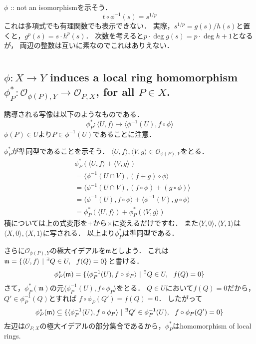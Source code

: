\documentclass[a4paper]{jarticle}
\newcommand{\I}[1]{\mathfrak{#1}}
\newcommand{\reg}[2]{\langle #1,#2 \rangle}
\begin{document}
    $\phi$ :: not an isomorphismを示そう．
    \[ t \circ \phi^{-1}(s)=s^{1/p} \]
    これは多項式でも有理関数でも表示できない．
    実際，$s^{1/p}=g(s)/h(s)$と置くと，$g^p(s)=s \cdot h^p(s)$．
    次数を考えると$p \cdot \deg g(s)=p \cdot \deg h+1$となるが，
    両辺の整数は互いに素なのでこれはありえない．

\section{} %
    \subsection{$\phi: X \to Y$ induces a local ring homomorphism $\phi_P^{\ast}: \mathcal{O}_{\phi(P), Y} \to \mathcal{O}_{P, X}$, for all $P \in X$.}
    誘導される写像は以下のようなものである．
    \[ \phi_P^{\ast}: \reg{U}{f} \mapsto \langle \phi^{-1}(U),f \circ \phi \rangle \]
    $\phi(P) \in U$より$P \in \phi^{-1}(U)$であることに注意．

    $\phi_P^{\ast}$が準同型であることを示そう．
    $\reg{U}{f}, \reg{V}{g} \in \mathcal{O}_{\phi(P), Y}$をとる．
    \begin{align*}
        {}& \phi_P^{\ast}(\reg{U}{f}+\reg{V}{g}) \\
        &   =\reg{\phi^{-1}(U \cap V)}{(f+g) \circ \phi} \\
        &   =\reg{\phi^{-1}(U \cap V)}{(f \circ \phi)+(g \circ \phi)} \\
        &   =\reg{\phi^{-1}(U)}{f \circ \phi}+\reg{\phi^{-1}(V)}{g \circ \phi} \\
        &   =\phi_P^{\ast}(\reg{U}{f})+\phi_P^{\ast}(\reg{V}{g})
    \end{align*}
    積については上の式変形を$+$から$\times$に変えるだけですむ．
    また$\reg{Y}{0}, \reg{Y}{1}$は$\reg{X}{0}, \reg{X}{1}$に写される．
    以上より$\phi_P^{\ast}$は準同型である．

    さらに$\mathcal{O}_{\phi(P), Y}$の極大イデアルを$\I{m}$としよう．
    これは$\I{m}=\{ \reg{U}{f} ~|~ \Exists{Q \in U} f(Q)=0 \}$と書ける．
    \[ \phi_P^{\ast}(\I{m})=\{ \reg{\phi_P^{-1}(U)}{f \circ \phi_P} ~|~ \Exists{Q \in U} f(Q)=0 \} \]
    さて，$\phi_P^{\ast}(\I{m})$の元$\reg{\phi_P^{-1}(U)}{f \circ \phi_P}$をとる．
    $Q \in U$において$f(Q)=0$だから，$Q' \in \phi_P^{-1}(Q)$とすれば
    $f \circ \phi_P(Q')=f(Q)=0$．
    したがって
    \[ \phi_P^{\ast}(\I{m}) \subseteq \{ \reg{\phi_P^{-1}(U)}{f \circ \phi_P} ~|~ \Exists{Q' \in \phi_P^{-1}(U)} f \circ \phi_P(Q')=0 \} \]
    左辺は$\mathcal{O}_{P, X}$の極大イデアルの部分集合であるから，$\phi_P^{\ast}$はhomomorphism of local rings.
\end{document}
